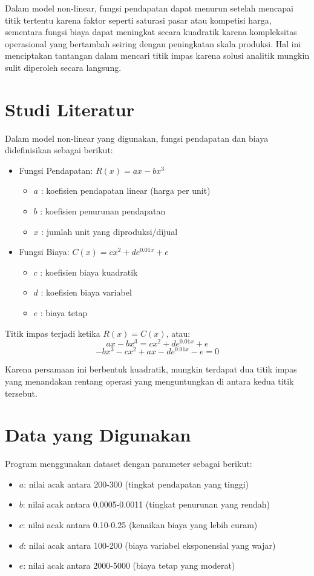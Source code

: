 \documentclass[conference]{IEEEtran}
\begin{document}
Dalam model non-linear, fungsi pendapatan dapat menurun setelah mencapai titik tertentu karena faktor seperti saturasi pasar atau kompetisi harga, sementara fungsi biaya dapat meningkat secara kuadratik karena kompleksitas operasional yang bertambah seiring dengan peningkatan skala produksi. Hal ini menciptakan tantangan dalam mencari titik impas karena solusi analitik mungkin sulit diperoleh secara langsung.

\section{Studi Literatur}
Dalam model non-linear yang digunakan, fungsi pendapatan dan biaya didefinisikan sebagai berikut:

\begin{itemize}
\item Fungsi Pendapatan: $R(x) = ax - bx^3$
\begin{itemize}
\item $a$ : koefisien pendapatan linear (harga per unit)
\item $b$ : koefisien penurunan pendapatan
\item $x$ : jumlah unit yang diproduksi/dijual
\end{itemize}

\item Fungsi Biaya: $C(x) = cx^2 + de^{0.01x} + e$
\begin{itemize}
\item $c$ : koefisien biaya kuadratik
\item $d$ : koefisien biaya variabel
\item $e$ : biaya tetap
\end{itemize}
\end{itemize}

Titik impas terjadi ketika $R(x) = C(x)$, atau:
\[ax - bx^3 = cx^2 + de^{0.01x} + e\]
\[-bx^3 - cx^2 + ax - de^{0.01x} - e = 0\]

Karena persamaan ini berbentuk kuadratik, mungkin terdapat dua titik impas yang menandakan rentang operasi yang menguntungkan di antara kedua titik tersebut.

\section{Data yang Digunakan}
Program menggunakan dataset dengan parameter sebagai berikut:
\begin{itemize}
\item $a$: nilai acak antara 200-300 (tingkat pendapatan yang tinggi)
\item $b$: nilai acak antara 0.0005-0.0011 (tingkat penurunan yang rendah)
\item $c$: nilai acak antara 0.10-0.25 (kenaikan biaya yang lebih curam)
\item $d$: nilai acak antara 100-200 (biaya variabel eksponensial yang wajar)
\item $e$: nilai acak antara 2000-5000 (biaya tetap yang moderat)
\end{itemize}
\end{document}

